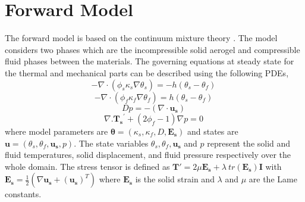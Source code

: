 \documentclass[pdf-a,balance,colorlinks,upint,subscriptcorrection,varvw,mathalfa=cal=boondoxo, spanish,french,vietnamese,russian,greek]{asmeconf}
\begin{document}
\section{Forward Model}
\noindent
The forward model is based on the continuum mixture theory \cite{tan2022predictive}. The model considers two phases which are the incompressible solid aerogel and compressible fluid phases between the materials.  The governing equations at steady state for the thermal and mechanical parts can be described using the following PDEs,
\begin{equation}\label{multiphase}
    - \nabla \cdot ( \phi_s \kappa_s \nabla \theta_s) = - h(\theta_s - \theta_f) \: 
\end{equation}
\begin{equation}
    - \nabla \cdot ( \phi_f \kappa_f \nabla \theta_f) = h(\theta_s - \theta_f) \: 
\end{equation}
\begin{equation}
    D p = -( \nabla \cdot \boldsymbol{u_{s}}) \:
\end{equation}
\begin{equation}\label{multiphase_end}
    \nabla . \boldsymbol{T_{s}}^{'} + (2 \phi_f - 1) \nabla p = 0 \:
\end{equation}
where model parameters are $\boldsymbol{\theta}= (\kappa_s, \kappa_f, D, \boldsymbol{E_{s}})$ and states are $\boldsymbol{u} = ( \theta_s, \theta_f, \boldsymbol{u_{s}}, p)$. The state variables $\theta_s, \theta_f, \boldsymbol{u_{s}}$ and $p$ represent the solid and fluid temperatures, solid displacement, and fluid pressure respectively over the whole domain. The stress tensor is defined as $\boldsymbol{T'} = 2 \mu \boldsymbol{E_{s}} + \lambda \: tr(\boldsymbol{E_{s}})\boldsymbol{I}$ with $\boldsymbol{E_{s}} = \frac{1}{2} (\nabla \boldsymbol{u_{s}} + (\boldsymbol{u_{s}})^{T})$ where $\boldsymbol{E_{s}}$ is the solid strain and $\lambda$ and $\mu$ are the Lame constants.
\end{document}

